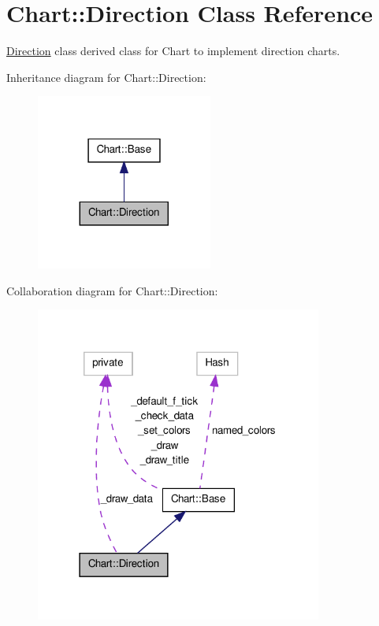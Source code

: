 \hypertarget{classChart_1_1Direction}{
\section{Chart::Direction Class Reference}
\label{classChart_1_1Direction}
}


\hyperlink{classChart_1_1Direction}{Direction} class derived class for Chart to implement direction charts.  




Inheritance diagram for Chart::Direction:\nopagebreak
\begin{figure}[H]
\begin{center}
\leavevmode
\includegraphics[width=164pt]{classChart_1_1Direction__inherit__graph}
\end{center}
\end{figure}


Collaboration diagram for Chart::Direction:\nopagebreak
\begin{figure}[H]
\begin{center}
\leavevmode
\includegraphics[width=267pt]{classChart_1_1Direction__coll__graph}
\end{center}
\end{figure}
